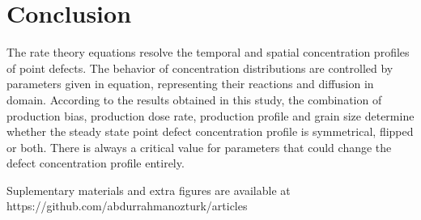 \documentclass[a4paper]{article}
\begin{document}
\section{Conclusion} \hspace{10pt}

The rate theory equations resolve the temporal and spatial concentration profiles of point defects. The behavior of concentration distributions are controlled by parameters given in equation, representing their reactions and diffusion in domain. According to the results obtained in this study, the combination of production bias, production dose rate, production profile and grain size determine whether the steady state point defect concentration profile is symmetrical, flipped or both. There is always a critical value for parameters that could change the defect concentration profile entirely.

Suplementary materials and extra figures are available at https://github.com/abdurrahmanozturk/articles



\end{document}
